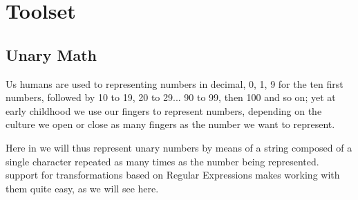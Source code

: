 \section{Toolset}

\subsection{Unary Math}
\label{sec:unarymath}
Us humans are used to representing numbers in decimal, 0, 1, 9 for the ten
first numbers, followed by 10 to 19, 20 to 29... 90 to 99, then 100 and so
on; yet at early childhood we use our fingers to represent numbers, depending
on the culture we open or close as many fingers as the number we want to
represent.

Here in \sed* we will thus represent unary numbers by means of a string
composed of a single character repeated as many times as the number being
represented.  \sed* support for transformations based on Regular Expressions
makes working with them quite easy, as we will see here.

